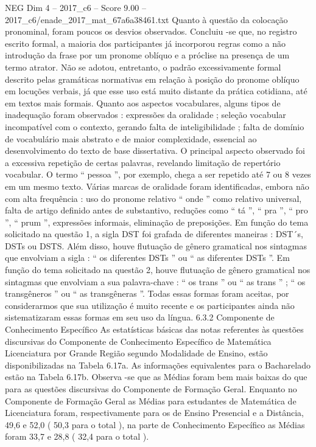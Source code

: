 \begin{textsample}{NEG Dim 4 – 2017\_c6 – Score 9.00 – 2017\_c6/enade\_2017\_mat\_67a6a38461.txt}
Quanto à questão da colocação pronominal, foram poucos os desvios observados.
Concluiu -se que, no registro escrito formal, a maioria dos participantes já incorporou regras como a não introdução da frase por um pronome oblíquo e a próclise na presença de um termo atrator.
Não se adotou, entretanto, o padrão excessivamente formal descrito pelas gramáticas normativas em relação à posição do pronome oblíquo em locuções verbais, já que esse uso está muito distante da prática cotidiana, até em textos mais formais.
Quanto aos aspectos vocabulares, alguns tipos de inadequação foram observados : expressões da oralidade ; seleção vocabular incompatível com o contexto, gerando falta de inteligibilidade ; falta de domínio de vocabulário mais abstrato e de maior complexidade, essencial ao desenvolvimento do texto de base dissertativa.
O principal aspecto observado foi a excessiva repetição de certas palavras, revelando limitação de repertório vocabular.
O termo “ pessoa ”, por exemplo, chega a ser repetido até 7 ou 8 vezes em um mesmo texto.
Várias marcas de oralidade foram identificadas, embora não com alta frequência : uso do pronome relativo “ onde ” como relativo universal, falta de artigo definido antes de substantivo, reduções como “ tá ”, “ pra ”, “ pro ”, “ prum ”, expressões informais, eliminação de preposições.
Em função do tema solicitado na questão 1, a sigla DST foi grafada de diferentes maneiras : DST´s, DSTs ou DSTS.
Além disso, houve flutuação de gênero gramatical nos sintagmas que envolviam a sigla : “ os diferentes DSTs ” ou “ as diferentes DSTs ”.
Em função do tema solicitado na questão 2, houve flutuação de gênero gramatical nos sintagmas que envolviam a sua palavra-chave : “ os trans ” ou “ as trans ” ; “ os transgêneros ” ou “ as transgêneras ”.
Todas essas formas foram aceitas, por considerarmos que sua utilização é muito recente e os participantes ainda não sistematizaram essas formas em seu uso da língua. 6.3.2 Componente de Conhecimento Específico As estatísticas básicas das notas referentes às questões discursivas do Componente de Conhecimento Específico de Matemática Licenciatura por Grande Região segundo Modalidade de Ensino, estão disponibilizadas na Tabela 6.17a.
As informações equivalentes para o Bacharelado estão na Tabela 6.17b.
Observa -se que as Médias foram bem mais baixas do que para as questões discursivas do Componente de Formação Geral.
Enquanto no Componente de Formação Geral as Médias para estudantes de Matemática de Licenciatura foram, respectivamente para os de Ensino Presencial e a Distância, 49,6 e 52,0 ( 50,3 para o total ), na parte de Conhecimento Específico as Médias foram 33,7 e 28,8 ( 32,4 para o total ).

\end{textsample}
